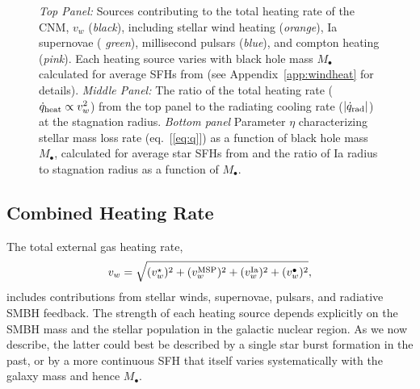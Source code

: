 \documentclass[usenatbib,fleqn]{mn2e}
\newcommand{\Mbh}[1][]{M_{\bullet#1}}
\newcommand{\vwO}{v_{w}}
\begin{document}
\begin{figure}
\caption{\label{fig:vwSources} {\it Top Panel:} Sources contributing
  to the total heating rate of the CNM, $\vwO$ ({\it black}),
  including stellar wind heating ({\it orange}), Ia supernovae ({\it
    green}), millisecond pulsars ({\it blue}), and compton heating
  ({\it pink}).  Each heating source varies with black hole mass
  $\Mbh$ calculated for average SFHs from
  \citet{MosterNaab+:2013a} (see Appendix~\ref{app:windheat} for
  details).  {\it Middle Panel:} The ratio of the total heating rate
  ($\dot{q}_{\rm heat} \propto v_{w}^{2}$) from the top panel to the
  radiating cooling rate ($|\dot{q}_{\rm rad}|$) at the stagnation
  radius. {\it Bottom panel} Parameter $\eta$ characterizing stellar
  mass loss rate (eq.~[\ref{eq:q}]) as a function of black hole mass
  $\Mbh$, calculated for average star SFHs from \citealt{MosterNaab+:2013a} and the
  ratio of Ia radius to stagnation radius as a function of $\Mbh$.}
\end{figure}





\subsection{Combined Heating Rate} 
\label{sec:combined}


The total external gas heating rate, 
\begin{equation}
\vwO = \sqrt{(v_{w}^{\star})^{2} + (v_{w}^{\rm MSP})^{2} + (v_{w}^{\rm Ia})^{2} + (v_{w}^{\bullet})^{2}},
\label{eq:vtot}
\end{equation}
includes contributions from stellar winds, supernovae, pulsars, and
radiative SMBH feedback.  The strength of each heating source depends
explicitly on the SMBH mass and the stellar population in the galactic
nuclear region.  As we now describe, the latter could best be
described by a single star burst formation in the past, or by a more
continuous SFH that itself varies systematically
with the galaxy mass and hence $\Mbh$.
\end{document}
